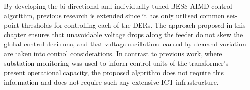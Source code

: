By developing the bi-directional and individually tuned BESS AIMD control algorithm, previous research is extended since it has only utilised common set-point thresholds for controlling each of the DERs.
The approach proposed in this chapter ensures that unavoidable voltage drops along the feeder do not skew the global control decisions, and that voltage oscillations caused by demand variation are taken into control considerations.
In contrast to previous work, where substation monitoring was used to inform control units of the transformer's present operational capacity, the proposed algorithm does not require this information and does not require such any extensive ICT infrastructure.





